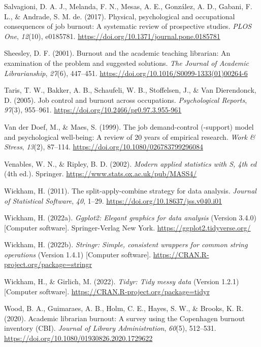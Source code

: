 \documentclass[
  twocolumn]{article}
\newlength{\cslhangindent}
\newenvironment{CSLReferences}[2] %
 {\begin{list}{}{%
  \setlength{\itemindent}{0pt}
  \setlength{\leftmargin}{0pt}
  \setlength{\parsep}{0pt}
  \ifodd #1
   \setlength{\leftmargin}{\cslhangindent}
   \setlength{\itemindent}{-1\cslhangindent}
  \fi
  \setlength{\itemsep}{#2\baselineskip}}}
 {\end{list}}
\begin{document}
\begin{CSLReferences}{1}{0}
Salvagioni, D. A. J., Melanda, F. N., Mesas, A. E., González, A. D.,
Gabani, F. L., \& Andrade, S. M. de. (2017). Physical, psychological and
occupational consequences of job burnout: A systematic review of
prospective studies. \emph{PLOS One}, \emph{12}(10), e0185781.
\url{https://doi.org/10.1371/journal.pone.0185781}

Sheesley, D. F. (2001). Burnout and the academic teaching librarian: An
examination of the problem and suggested solutions. \emph{The Journal of
Academic Librarianship}, \emph{27}(6), 447--451.
\url{https://doi.org/10.1016/S0099-1333(01)00264-6}

Taris, T. W., Bakker, A. B., Schaufeli, W. B., Stoffelsen, J., \& Van
Dierendonck, D. (2005). Job control and burnout across occupations.
\emph{Psychological Reports}, \emph{97}(3), 955--961.
\url{https://doi.org/10.2466/pr0.97.3.955-961}

Van der Doef, M., \& Maes, S. (1999). The job demand-control (-support)
model and psychological well-being: A review of 20 years of empirical
research. \emph{Work \& Stress}, \emph{13}(2), 87--114.
\url{https://doi.org/10.1080/026783799296084}

Venables, W. N., \& Ripley, B. D. (2002). \emph{Modern applied
statistics with {S}, 4th ed} (4th ed.). Springer.
\url{https://www.stats.ox.ac.uk/pub/MASS4/}

Wickham, H. (2011). The split-apply-combine strategy for data analysis.
\emph{Journal of Statistical Software}, \emph{40}, 1--29.
\url{https://doi.org/10.18637/jss.v040.i01}

Wickham, H. (2022a). \emph{Ggplot2: Elegant graphics for data analysis}
(Version 3.4.0) {[}Computer software{]}. Springer-Verlag New York.
\url{https://ggplot2.tidyverse.org/}

Wickham, H. (2022b). \emph{Stringr: Simple, consistent wrappers for
common string operations} (Version 1.4.1) {[}Computer software{]}.
\url{https://CRAN.R-project.org/package=stringr}

Wickham, H., \& Girlich, M. (2022). \emph{Tidyr: Tidy messy data}
(Version 1.2.1) {[}Computer software{]}.
\url{https://CRAN.R-project.org/package=tidyr}

Wood, B. A., Guimaraes, A. B., Holm, C. E., Hayes, S. W., \& Brooks, K.
R. (2020). Academic librarian burnout: A survey using the {Copenhagen}
burnout inventory ({CBI}). \emph{Journal of Library Administration},
\emph{60}(5), 512--531.
\url{https://doi.org/10.1080/01930826.2020.1729622}

\end{CSLReferences}
\end{document}
